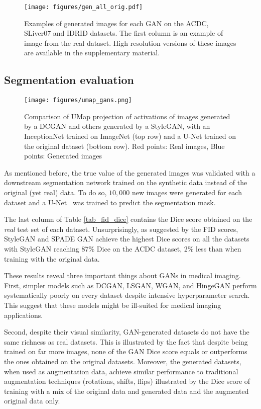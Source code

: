 \documentclass[preprint,12pt, authoryear]{elsarticle}
\begin{document}
\begin{figure*}[ht]
\centering
\texttt{[image: figures/gen\_all\_orig.pdf]}
\caption{\small Examples of generated images for each GAN on the ACDC, SLiver07 and IDRID datasets. The first column is an example of image from the real dataset.  High resolution versions of these images are available in the supplementary material.}
\label{fig_gen_images_ex}
\end{figure*}
\subsection{Segmentation evaluation}
\label{sec:seg_eval}


\begin{figure}[h]
\texttt{[image: figures/umap\_gans.png]}
  \caption{\small Comparison of UMap projection of activations of images generated by a DCGAN and others generated by a StyleGAN, with an InceptionNet trained on ImageNet (top row) and a U-Net trained on the original dataset (bottom row). Red points: Real images, Blue points: Generated images }
\label{fig_umap_comparison}
\end{figure}

As mentioned before, the true value of the generated images was validated with a downstream segmentation network trained on the synthetic data instead of the original (yet real) data.  To do so, $10,000$ new images were generated for each dataset and a U-Net~\citep{ronneberger2015u} was trained to predict the segmentation mask.  

The last column of Table \ref{tab_fid_dice} contains the Dice score obtained on the {\em real} test set of each dataset.  Unsurprisingly, as suggested by the FID scores, StyleGAN and SPADE GAN achieve the highest Dice scores on all the datasets with StyleGAN reaching 87\% Dice on the ACDC dataset, 2\% less than when training with the original data. 

These results reveal three important things about GANs in medical imaging.  
First, simpler models such as DCGAN, LSGAN, WGAN, and HingeGAN perform systematically poorly on every dataset despite intensive hyperparameter search.  This suggest that these models might be ill-suited for medical imaging applications. 

Second, despite their visual similarity, GAN-generated datasets do not have the same richness as real datasets.  This is illustrated by the fact that despite being trained on far more images, none of the GAN Dice score equals or outperforms the ones obtained on the original datasets. Moreover, the generated datasets, when used as augmentation data, achieve similar performance to traditional augmentation techniques (rotations, shifts, flips) illustrated by the Dice score of training with a mix of the original data and generated data and the augmented original data only.
\end{document}

